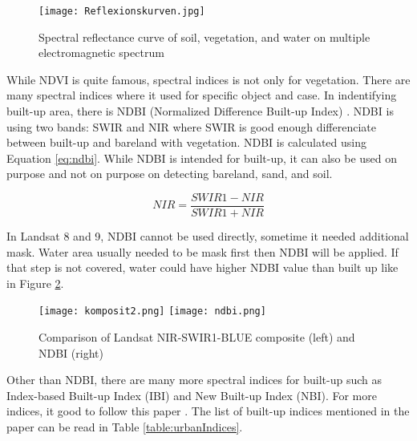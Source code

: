 \begin{figure}[htbp]
	\label{fig:spectralCurve}
	\centering
	\texttt{[image: Reflexionskurven.jpg]}
	\caption{Spectral reflectance curve of soil, vegetation, and water on multiple electromagnetic spectrum \cite{siegmund2005fernes}}
\end{figure}

While NDVI is quite famous, spectral indices is not only for vegetation. There are many spectral indices where it used for specific object and case. In indentifying built-up area, there is NDBI (Normalized Difference Built-up Index) \cite{zhang2009bi}. NDBI is using two bands: SWIR and NIR where SWIR is good enough differenciate between built-up and bareland with vegetation. NDBI is calculated using Equation \ref{eq:ndbi}. While NDBI is intended for built-up, it can also be used on purpose and not on purpose on detecting bareland, sand, and soil.

\begin{equation}
	\label{eq:ndbi}
	NIR = \frac{SWIR1 - NIR}{SWIR1 + NIR}
\end{equation}

In Landsat 8 and 9, NDBI cannot be used directly, sometime it needed additional mask. Water area usually needed to be mask first then NDBI will be applied. If that step is not covered, water could have higher NDBI value than built up like in Figure \ref{fig:ndbi}.

\begin{figure}[htbp]
	\label{fig:ndbi}
	\centering
	\texttt{[image: komposit2.png]}
	\texttt{[image: ndbi.png]}
	\caption{Comparison of Landsat NIR-SWIR1-BLUE composite (left) and NDBI (right)}
\end{figure}

Other than NDBI, there are many more spectral indices for built-up such as Index-based Built-up Index (IBI) and New Built-up Index (NBI). For more indices, it good to follow this paper \cite{valdiviezo2018built}. The list of built-up indices mentioned in the paper can be read in Table \ref{table:urbanIndices}.

